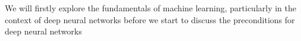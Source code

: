 We will firstly explore the fundamentals of machine learning, particularly in the context of deep neural networks before we start to discuss the preconditions for deep neural networks 